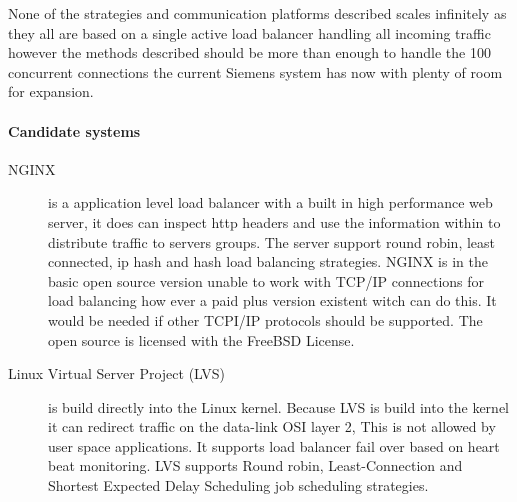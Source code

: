 None of the strategies and communication platforms described scales infinitely as they all are based on a single active load balancer handling all incoming traffic however the methods described should be more than enough to handle the 100 concurrent connections the current Siemens system has now with plenty of room for expansion. 



\paragraph{Candidate systems}

\begin{description}
\item[NGINX] is a application level load balancer with a built in high performance web server, it does can inspect http headers and use the information within to distribute traffic to servers groups.
The server support round robin, least connected, ip hash and hash load balancing strategies. 
NGINX is in the basic open source version unable to work with TCP/IP connections for load balancing how ever a paid plus version existent witch can do this.
It would be needed if other TCPI/IP protocols should be supported.
The open source is licensed with the FreeBSD License.

\item[Linux Virtual Server Project\cite{zhang2000linuxVirtualServer} (LVS)] is build directly into the Linux kernel.
Because LVS is build into the kernel it can redirect traffic on the data-link OSI layer 2, This is not allowed by user space applications.
It supports load balancer fail over based on heart beat monitoring.
LVS supports  Round robin, Least-Connection and Shortest Expected Delay Scheduling job scheduling strategies.


\end{description}





